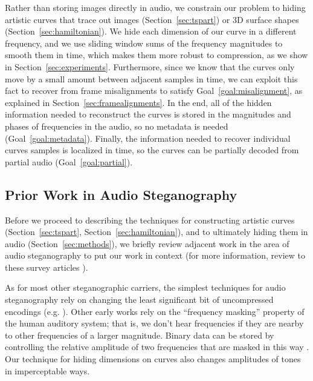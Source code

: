\documentclass[runningheads]{llncs}
\begin{document}
Rather than storing images directly in audio, we constrain our problem to hiding artistic curves that trace out images (Section~\ref{sec:tspart}) or 3D surface shapes (Section~\ref{sec:hamiltonian}).  We hide each dimension of our curve in a different frequency, and we use sliding window sums of the frequency magnitudes to smooth them in time, which makes them more robust to compression, as we show in Section~\ref{sec:experiments}.  Furthermore, since we know that the curves only move by a small amount between adjacent samples in time, we can exploit this fact to recover from frame misalignments to satisfy Goal~\ref{goal:misalignment}, as explained in Section~\ref{sec:framealignments}.  In the end, all of the hidden information needed to reconstruct the curves is stored in the magnitudes and phases of frequencies in the audio, so no metadata is needed (Goal~\ref{goal:metadata}).  Finally, the information needed to recover individual curves samples is localized in time, so the curves can be partially decoded from partial audio (Goal~\ref{goal:partial}).


\subsection{Prior Work in Audio Steganography}
\label{sec:priorwork}

Before we proceed to describing the techniques for constructing artistic curves (Section~\ref{sec:tspart}, Section~\ref{sec:hamiltonian}), and to ultimately hiding them in audio (Section~\ref{sec:methods}), we briefly review adjacent work in the area of audio steganography to put our work in context (for more information, review to these survey articles \cite{djebbar_comparative_2012, dutta_overview_2020}).

As for most other steganographic carriers, the simplest techniques for audio steganography rely on changing the least significant bit of uncompressed encodings (e.g. \cite{cvejic_wavelet_2002}).  Other early works rely on the ``frequency masking'' property of the human auditory system; that is, we don't hear frequencies if they are nearby to other frequencies of a larger magnitude.  Binary data can be stored by controlling the relative amplitude of two frequencies that are masked in this way \cite{gopalan_unified_2009, gopalan2004audio}.  Our technique for hiding dimensions on curves also changes amplitudes of tones in imperceptable ways.  
\end{document}
